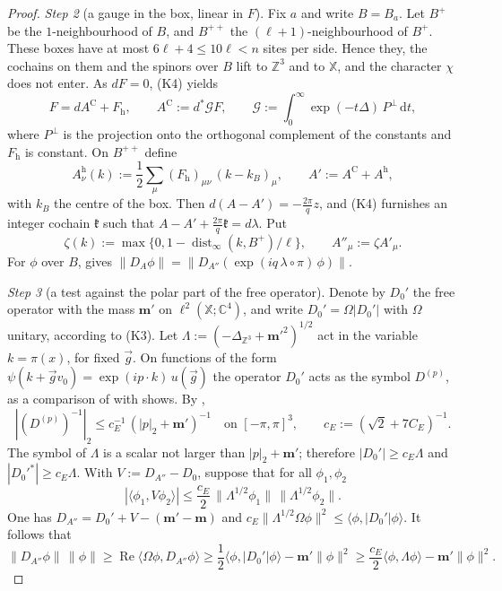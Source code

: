 \documentclass[11pt,letterpaper,reqno]{amsart}
\theoremstyle{definition}
\begin{document}
\begin{proof}
\emph{Step 2} (a gauge in the box, linear in $F$).
Fix $a$ and write $B=B_a$.
Let $B^+$ be the $1$-neighbourhood of $B$, and $B^{++}$ the $(\ell+1)$-neighbourhood of $B^+$.
These boxes have at most $6\ell+4\le10\ell<n$ sites per side.
Hence they, the cochains on them and the spinors over $B$ lift to $\mathbb Z^3$ and to $\mathbb X$, and the character $\chi$ does not enter.
As $dF=0$, (K4) yields
\begin{equation*}
F=dA^{\mathrm C}+F_{\mathrm h},\qquad A^{\mathrm C}:=d^*\mathcal GF,\qquad\mathcal G:=\int_0^\infty\exp(-t\Delta)\,P^\perp\,\mathrm dt,
\end{equation*}
where $P^\perp$ is the projection onto the orthogonal complement of the constants and $F_{\mathrm h}$ is constant.
On $B^{++}$ define
\begin{equation*}
A^{\mathrm h}_\nu(k):=\frac12\sum_\mu(F_{\mathrm h})_{\mu\nu}\,(k-k_B)_\mu,\qquad A':=A^{\mathrm C}+A^{\mathrm h},
\end{equation*}
with $k_B$ the centre of the box.
Then $d(A-A')=-\frac{2\pi}{q}z$, and (K4) furnishes an integer cochain $\mathfrak k$ such that $A-A'+\frac{2\pi}{q}\mathfrak k=d\lambda$.
Put
\begin{equation*}
\zeta(k):=\max\{0,1-\operatorname{dist}_\infty(k,B^+)/\ell\},\qquad A''_\mu:=\zeta A'_\mu.
\end{equation*}
For $\phi$ over $B$, \cite[Proposition~3.16\,(a)]{QEDII} gives $\|D_A\phi\|=\|D_{A''}(\exp(iq\,\lambda\circ\pi)\,\phi)\|$.

\emph{Step 3} (a test against the polar part of the free operator).
Denote by $D_0'$ the free operator with the mass $\mathbf m'$ on $\ell^2(\mathbb X;\mathbb C^4)$, and write $D_0'=\Omega|D_0'|$ with $\Omega$ unitary, according to (K3).
Let $\Lambda:=(-\Delta_{\mathbb Z^3}+\mathbf m'^2)^{1/2}$ act in the variable $k=\pi(x)$, for fixed $\vec g$.
On functions of the form $\psi(k+\vec gv_0)=\exp(ip\cdot k)\,u(\vec g)$ the operator $D_0'$ acts as the symbol $D^{(p)}$, as a comparison of \cite[Proposition~3.18\,(a)]{QEDII} with \cite[Proposition~37.1\,(a)]{QEDIII} shows.
By \cite[Proposition~37.1\,(f)]{QEDIII},
\begin{equation*}
|(D^{(p)})^{-1}|_2\le c_E^{-1}\,(|p|_2+\mathbf m')^{-1}\quad\text{on }[-\pi,\pi]^3,\qquad c_E:=(\sqrt2+7C_E)^{-1}.
\end{equation*}
The symbol of $\Lambda$ is a scalar not larger than $|p|_2+\mathbf m'$; therefore $|D_0'|\ge c_E\Lambda$ and $|D_0'^*|\ge c_E\Lambda$.
With $V:=D_{A''}-D_0$, suppose that for all $\phi_1,\phi_2$
\begin{equation}
\tag{5.1}\label{eq:polar-form-bound}
|\langle\phi_1,V\phi_2\rangle|\le\frac{c_E}{2}\,\|\Lambda^{1/2}\phi_1\|\,\|\Lambda^{1/2}\phi_2\|.
\end{equation}
One has $D_{A''}=D_0'+V-(\mathbf m'-\mathbf m)$ and $c_E\|\Lambda^{1/2}\Omega\phi\|^2\le\langle\phi,|D_0'|\phi\rangle$.
It follows that
\begin{equation*}
\|D_{A''}\phi\|\,\|\phi\|\ge\operatorname{Re}\langle\Omega\phi,D_{A''}\phi\rangle\ge\frac12\langle\phi,|D_0'|\phi\rangle-\mathbf m'\|\phi\|^2\ge\frac{c_E}{2}\langle\phi,\Lambda\phi\rangle-\mathbf m'\|\phi\|^2.
\end{equation*}


\end{proof}
\end{document}
